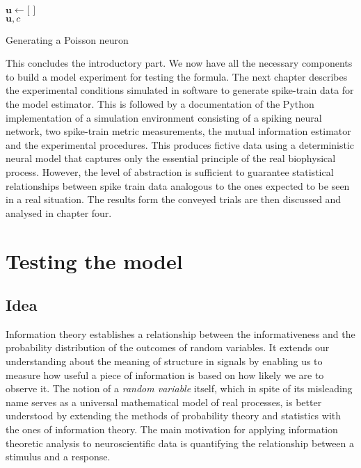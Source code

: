 \documentclass[12pt]{extarticle}
\begin{document}
\begin{algorithm}[H]
  $\mathbf{u} \leftarrow [$ $]$\\
  \KwRet $\mathbf{u}, c$\\
  \vspace{11pt} \caption{Generating a Poisson neuron}
\end{algorithm}
\vspace{11pt}

\noindent
This concludes the introductory part. We now have all the necessary
components to build a model experiment for testing the
formula. The next chapter describes the experimental conditions simulated in
software to generate spike-train data for the model estimator. This is followed
by a documentation of the Python implementation of a simulation environment 
consisting of a spiking neural network, two spike-train metric measurements,
the mutual information estimator and the experimental procedures. This produces fictive 
data using a deterministic neural model that captures only the essential principle
of the real biophysical process. However, the level of abstraction is sufficient to
guarantee statistical relationships between spike train data analogous to the ones
expected to be seen in a real situation. The results form the conveyed trials are
then discussed and analysed in chapter four. 




\newpage
\section{Testing the model}
\subsection{Idea}

\noindent
Information theory establishes a relationship between the informativeness and
the probability distribution of the outcomes of random variables. It extends our
understanding about the meaning of structure in signals by enabling us
to measure how useful a piece of information is based on how likely we are to 
observe it. The notion of a \textit{random variable} itself, which in spite of its 
misleading name serves as a universal mathematical model of real processes, is 
better understood by extending the methods of probability theory and statistics
with the ones of information theory. The main motivation for applying information
theoretic analysis to neuroscientific data is quantifying the relationship between
a stimulus and a response.\\
\end{document}
